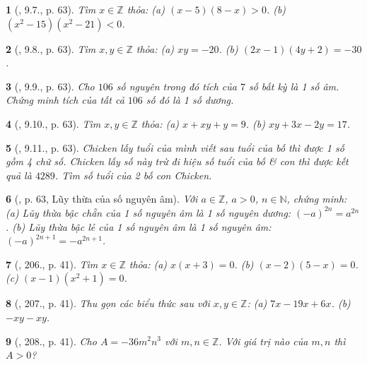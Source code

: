 \documentclass{article}
\newtheorem{baitoan}{}
\begin{document}
\begin{baitoan}[\cite{Binh_boi_duong_Toan_6_tap_1}, 9.7., p. 63]
	Tìm $x\in\mathbb{Z}$ thỏa: (a) $(x - 5)(8 - x) > 0$. (b) $(x^2 - 15)(x^2 - 21) < 0$.
\end{baitoan}

\begin{baitoan}[\cite{Binh_boi_duong_Toan_6_tap_1}, 9.8., p. 63]
	Tìm $x,y\in\mathbb{Z}$ thỏa: (a) $xy = -20$. (b) $(2x - 1)(4y + 2) = -30$.
\end{baitoan}

\begin{baitoan}[\cite{Binh_boi_duong_Toan_6_tap_1}, 9.9., p. 63]
	Cho $106$ số nguyên trong đó tích của $7$ số bất kỳ là 1 số âm. Chứng minh tích của tất cả $106$ số đó là 1 số dương.
\end{baitoan}

\begin{baitoan}[\cite{Binh_boi_duong_Toan_6_tap_1}, 9.10., p. 63]
	Tìm $x,y\in\mathbb{Z}$ thỏa: (a) $x + xy + y = 9$. (b) $xy + 3x - 2y = 17$.
\end{baitoan}

\begin{baitoan}[\cite{Binh_boi_duong_Toan_6_tap_1}, 9.11., p. 63]
	Chicken lấy tuổi của mình viết sau tuổi của bố thì được 1 số gồm 4 chữ số. Chicken lấy số này trừ đi hiệu số tuổi của bố \& con thì được kết quả là $4289$. Tìm số tuổi của 2 bố con Chicken.
\end{baitoan}

\begin{baitoan}[\cite{Binh_boi_duong_Toan_6_tap_1}, p. 63, Lũy thừa của số nguyên âm]
	Với $a\in\mathbb{Z}$, $a > 0$, $n\in\mathbb{N}$, chứng minh: (a) Lũy thừa bậc chẵn của 1 số nguyên âm là 1 số nguyên dương: $(-a)^{2n} = a^{2n}$. (b) Lũy thừa bậc lẻ của 1 số nguyên âm là 1 số nguyên âm: $(-a)^{2n + 1} = -a^{2n + 1}$.
\end{baitoan}

\begin{baitoan}[\cite{Tuyen_Toan_6}, 206., p. 41]
	Tìm $x\in\mathbb{Z}$ thỏa: (a) $x(x + 3) = 0$. (b) $(x - 2)(5 - x) = 0$. (c) $(x - 1)(x^2 + 1) = 0$.
\end{baitoan}

\begin{baitoan}[\cite{Tuyen_Toan_6}, 207., p. 41]
	Thu gọn các biểu thức sau với $x,y\in\mathbb{Z}$: (a) $7x - 19x + 6x$. (b) $-xy - xy$.
\end{baitoan}

\begin{baitoan}[\cite{Tuyen_Toan_6}, 208., p. 41]
	Cho $A = -36m^2n^3$ với $m,n\in\mathbb{Z}$. Với giá trị nào của $m,n$ thì $A > 0$?
\end{baitoan}
\end{document}
